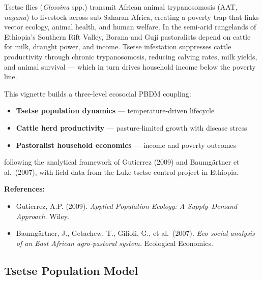 Tsetse flies (\emph{Glossina} spp.) transmit African animal trypanosomosis (AAT, \emph{nagana}) to livestock across sub-Saharan Africa, creating a poverty trap that links vector ecology, animal health, and human welfare. In the semi-arid rangelands of Ethiopia’s Southern Rift Valley, Borana and Guji pastoralists depend on cattle for milk, draught power, and income. Tsetse infestation suppresses cattle productivity through chronic trypanosomosis, reducing calving rates, milk yields, and animal survival — which in turn drives household income below the poverty line.



This vignette builds a three-level ecosocial PBDM coupling:



\begin{itemize}
\item[1. ] \textbf{Tsetse population dynamics} — temperature-driven lifecycle


\item[2. ] \textbf{Cattle herd productivity} — pasture-limited growth with disease  stress


\item[3. ] \textbf{Pastoralist household economics} — income and poverty outcomes

\end{itemize}


following the analytical framework of Gutierrez (2009) and Baumgärtner et al.~(2007), with field data from the Luke tsetse control project in Ethiopia.



\textbf{References:}



\begin{itemize}
\item Gutierrez, A.P. (2009). \emph{Applied Population Ecology: A Supply–Demand Approach.} Wiley.


\item Baumgärtner, J., Getachew, T., Gilioli, G., et al.~(2007). \emph{Eco-social analysis of an East African agro-pastoral system.} Ecological Economics.

\end{itemize}


\subsection{Tsetse Population Model}



